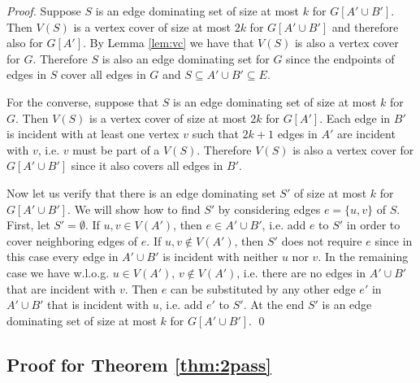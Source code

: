 \documentclass[draft,a4paper]{llncs}
\begin{document}
\begin{proof}
 Suppose $S$ is an edge dominating set of size at most $k$ for $G[A' \cup B']$. Then $V(S)$ is a vertex cover of size at most $2k$  for $G[A' \cup B']$ and therefore also for $G[A']$. By Lemma \ref{lem:vc} we have that $V(S)$ is also a vertex cover for $G$. Therefore $S$ is also an edge dominating set for $G$ since the endpoints of edges in $S$ cover all edges in $G$ and $S \subseteq A' \cup B' \subseteq E$.
 
 For the converse, suppose that $S$ is an edge dominating set of size at most $k$ for $G$. Then $V(S)$ is a vertex cover of size at most $2k$ for $G[A']$. Each edge in $B'$ is incident with at least one vertex $v$ such that $2k+1$ edges in $A'$ are incident with $v$, i.e. $v$ must be part of a $V(S)$. Therefore $V(S)$ is also a vertex cover for $G[A' \cup B']$ since it also covers all edges in $B'$.
 
 Now let us verify that there is an edge dominating set $S'$ of size at most $k$ for $G[A' \cup B']$. We will show how to find $S'$ by considering edges $e = \{u, v\}$ of $S$. First, let $S' = \emptyset$. If $u, v \in V(A')$, then $e \in A' \cup B'$, i.e. add $e$ to $S'$ in order to cover neighboring edges of $e$.
 If $u, v \notin V(A')$, then $S'$ does not require $e$ since in this case every edge in $A' \cup B'$ is incident with neither $u$ nor $v$.
 In the remaining case we have w.l.o.g. $u \in V(A')$, $v \notin V(A')$, i.e. there are no edges in $A' \cup B'$ that
 are incident with $v$. Then $e$ can be substituted by any other edge $e'$ in $A' \cup B'$ that is incident with $u$, i.e. add $e'$ to $S'$. At the end $S'$ is an edge dominating set of size at most $k$ for $G[A' \cup B']$. \qed \end{proof}

\subsection{Proof for Theorem \ref{thm:2pass}}
\end{document}
